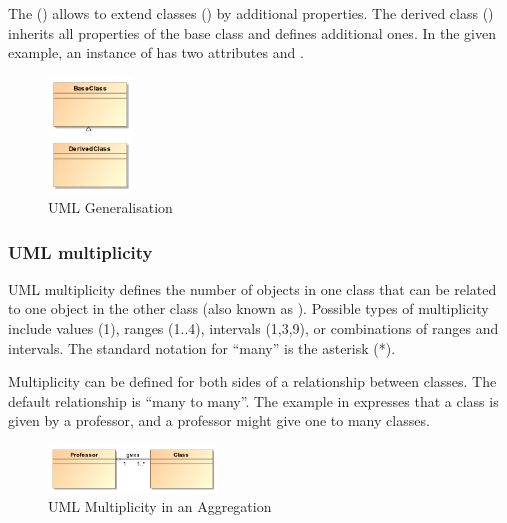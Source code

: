 The  () allows to extend classes () by additional properties. The derived class () inherits all properties of the base class and defines additional ones. In the given example, an instance of  has two attributes  and .
%
\begin{figure}[h]
\centering
\includegraphics[width=0.2\textwidth]{images/pdf/umlGeneralisation}
\caption{UML Generalisation}
\label{fig:umlGeneralisation}
\end{figure}
%
\subsubsection{UML multiplicity}
UML multiplicity defines the number of objects in one class that can be related to one object in the other class (also known as ). Possible types of multiplicity include values (1), ranges (1$..$4), intervals (1,3,9), or combinations of ranges and intervals. The standard notation for ``many'' is the asterisk (*). 

Multiplicity can be defined for both sides of a relationship between classes. The default relationship is ``many to many''. 
The example in  expresses that a class is given by a professor, and a professor might give one to many classes.
\begin{figure}[h]
\centering
\includegraphics[width=0.4\textwidth]{images/pdf/umlMultiplicity}
\caption{UML Multiplicity in an Aggregation}
\label{fig:umlMulti}
\end{figure}

